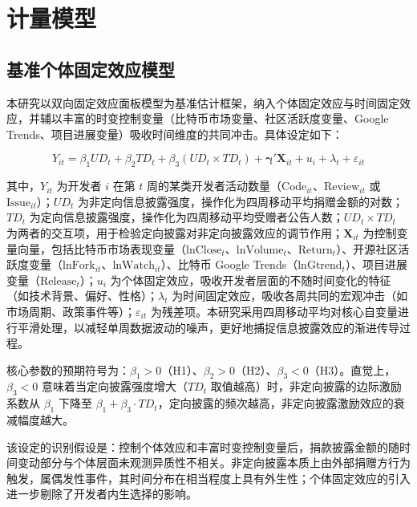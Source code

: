 \documentclass[
    type = master, %
    degree = professional,        %
    decl-page,  %
    twoside,                %
    fontset = fandol %
  ]{njuthesis}
\begin{document}
\section{计量模型}
\label{sec:model-1}

\subsection{基准个体固定效应模型}
\label{sec:fe-model}

本研究以双向固定效应面板模型为基准估计框架，纳入个体固定效应与时间固定效应，并辅以丰富的时变控制变量（比特币市场变量、社区活跃度变量、Google Trends、项目进展变量）吸收时间维度的共同冲击。具体设定如下：

\begin{equation}
\label{eq:fe-model}
Y_{it} = \beta_1 UD_t + \beta_2 TD_t
       + \beta_3 (UD_t \times TD_t)
       + \boldsymbol{\gamma}' \mathbf{X}_{it} + u_i + \lambda_t + \varepsilon_{it}
\end{equation}

其中，$Y_{it}$ 为开发者 $i$ 在第 $t$ 周的某类开发者活动数量（$\text{Code}_{it}$、$\text{Review}_{it}$ 或 $\text{Issue}_{it}$）；$UD_t$ 为非定向信息披露强度，操作化为四周移动平均捐赠金额的对数；$TD_t$ 为定向信息披露强度，操作化为四周移动平均受赠者公告人数；$UD_t \times TD_t$ 为两者的交互项，用于检验定向披露对非定向披露效应的调节作用；$\mathbf{X}_{it}$ 为控制变量向量，包括比特币市场表现变量（$\text{lnClose}_t$、$\text{lnVolume}_t$、$\text{Return}_t$）、开源社区活跃度变量（$\text{lnFork}_{it}$、$\text{lnWatch}_{it}$）、比特币 Google Trends（$\text{lnGtrend}_t$）、项目进展变量（$\text{Release}_t$）；$u_i$ 为个体固定效应，吸收开发者层面的不随时间变化的特征（如技术背景、偏好、性格）；$\lambda_t$ 为时间固定效应，吸收各周共同的宏观冲击（如市场周期、政策事件等）；$\varepsilon_{it}$ 为残差项。本研究采用四周移动平均对核心自变量进行平滑处理，以减轻单周数据波动的噪声，更好地捕捉信息披露效应的渐进传导过程。

核心参数的预期符号为：$\beta_1 > 0$（H1）、$\beta_2 > 0$（H2）、$\beta_3 < 0$（H3）。直觉上，$\beta_3 < 0$ 意味着当定向披露强度增大（$TD_t$ 取值越高）时，非定向披露的边际激励系数从 $\beta_1$ 下降至 $\beta_1 + \beta_3 \cdot TD_t$，定向披露的频次越高，非定向披露激励效应的衰减幅度越大。

该设定的识别假设是：控制个体效应和丰富时变控制变量后，捐款披露金额的随时间变动部分与个体层面未观测异质性不相关。非定向披露本质上由外部捐赠方行为触发，属偶发性事件，其时间分布在相当程度上具有外生性；个体固定效应的引入进一步剔除了开发者内生选择的影响。
\end{document}
